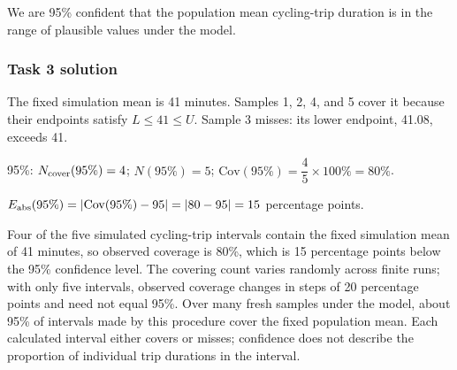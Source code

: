 \par\smallskip
{}
We are 95\% confident that the population mean cycling-trip duration is in the range of plausible values under the model.

\vspace{-3mm}
\subsubsection*{Task 3 solution}
\vspace{-3mm}
The fixed simulation mean is 41 minutes. Samples 1, 2, 4, and 5 cover it because their endpoints satisfy $L\leq41\leq U$. Sample 3 misses: its lower endpoint, 41.08, exceeds 41.
\par 95\%: $N_{\rm cover}(95\%)=4$; $N(95\%)=5$; $\mathrm{Cov}(95\%)=\dfrac45\times100\%=80\%$.
\par $E_{\rm abs}(95\%)=|\mathrm{Cov}(95\%)-95|=|80-95|=15$ percentage points.

Four of the five simulated cycling-trip intervals contain the fixed simulation mean of 41 minutes, so observed coverage is 80\%, which is 15 percentage points below the 95\% confidence level. The covering count varies randomly across finite runs; with only five intervals, observed coverage changes in steps of 20 percentage points and need not equal 95\%. Over many fresh samples under the model, about 95\% of intervals made by this procedure cover the fixed population mean. Each calculated interval either covers or misses; confidence does not describe the proportion of individual trip durations in the interval.

